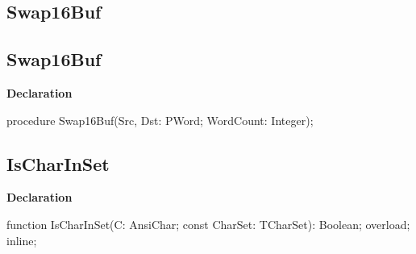 \documentclass{report}
\newif\ifpdf
\begin{document}
\subsection*{\large{\textbf{Swap16Buf}}\normalsize\hspace{1ex}\hrulefill}
\else
\subsection*{Swap16Buf}
\fi
\label{PasDoc_Utils-Swap16Buf}
\begin{list}{}{
\setlength{\itemindent}{0cm}
\setlength{\listparindent}{0cm}
\setlength{\leftmargin}{\evensidemargin}
\addtolength{\leftmargin}{\tmplength}
\settowidth{\labelsep}{X}
\addtolength{\leftmargin}{\labelsep}
\setlength{\labelwidth}{\tmplength}
}
\item[\textbf{Declaration}\hfill]
\ifpdf
\begin{flushleft}
\fi
\begin{ttfamily}
procedure Swap16Buf(Src, Dst: PWord; WordCount: Integer);\end{ttfamily}

\ifpdf
\end{flushleft}
\fi

\end{list}
\ifpdf
\subsection*{\large{\textbf{IsCharInSet}}\normalsize\hspace{1ex}\hrulefill}
\else
\subsection*{IsCharInSet}
\fi
\label{PasDoc_Utils-IsCharInSet}
\begin{list}{}{
\setlength{\itemindent}{0cm}
\setlength{\listparindent}{0cm}
\setlength{\leftmargin}{\evensidemargin}
\addtolength{\leftmargin}{\tmplength}
\settowidth{\labelsep}{X}
\addtolength{\leftmargin}{\labelsep}
\setlength{\labelwidth}{\tmplength}
}
\item[\textbf{Declaration}\hfill]
\ifpdf
\begin{flushleft}
\fi
\begin{ttfamily}
function IsCharInSet(C: AnsiChar; const CharSet: TCharSet): Boolean; overload; inline;\end{ttfamily}

\ifpdf
\end{flushleft}
\fi

\end{list}
\ifpdf
\end{document}
